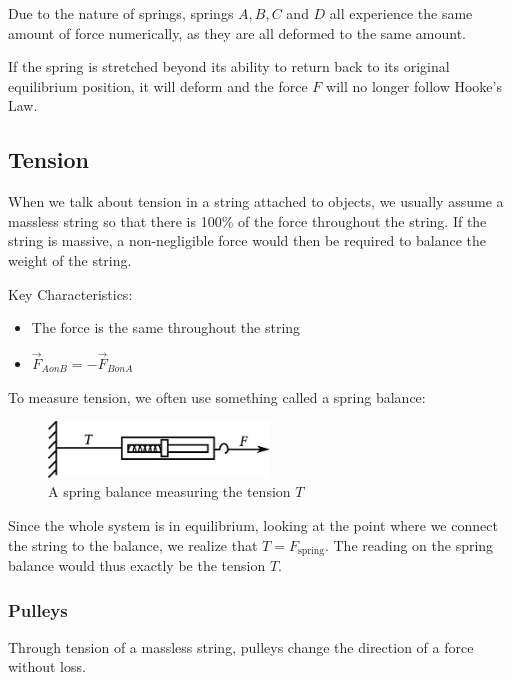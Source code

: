 \documentclass[11pt]{article}
\numberwithin{equation}{section}
\begin{document}
		Due to the nature of springs, springs $A, B, C$ and $D$ all experience the same amount of force numerically, as they are all deformed to the same amount.
		
		If the spring is stretched beyond its ability to return back to its original equilibrium position, it will deform and the force $F$ will no longer follow Hooke's Law.
		
		\subsection{Tension}
		When we talk about tension in a string attached to objects, we usually assume a massless string so that there is 100\% of the force throughout the string. If the string is massive, a non-negligible force would then be required to balance the weight of the string.
		
		Key Characteristics:
		\begin{itemize}
			\item The force is the same throughout the string
			\item $\vec{F}_{A on B} = -\vec{F}_{B on A}$
		\end{itemize}
		\pagebreak
		To measure tension, we often use something called a spring balance: 
		
		\begin{figure}[h]
			\centering
			\includegraphics[height=1.5cm]{springbalance.eps}
			\caption{A spring balance measuring the tension $T$}
			\label{fig:springbalance}
		\end{figure}

		Since the whole system is in equilibrium, looking at the point where we connect the string to the balance, we realize that $T = F_{\text{spring}}$. The reading on the spring balance would thus exactly be the tension $T$.

			\subsubsection{Pulleys}
			Through tension of a massless string, pulleys change the direction of a force without loss. 
		
\end{document}
